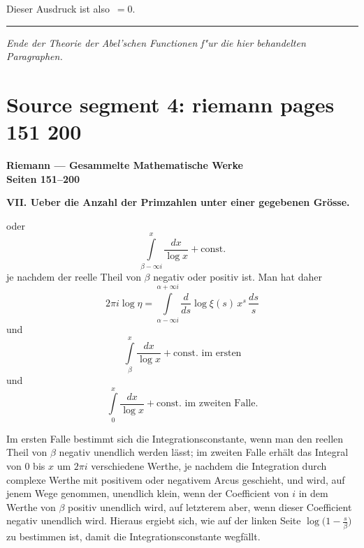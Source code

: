 \documentclass[12pt,a4paper]{book}
\theoremstyle{definition}
\theoremstyle{remark}
\begin{document}
Dieser Ausdruck ist also~$= 0$.

\bigskip
\begin{center}
\rule{0.5\textwidth}{0.4pt}
\end{center}

\vfill
\begin{center}
\textit{Ende der Theorie der Abel'schen Functionen f"ur die hier behandelten
Paragraphen.}
\end{center}

\clearpage
\chapter*{Source segment 4: riemann pages 151 200}

\begin{center}
\Large\textbf{Riemann --- Gesammelte Mathematische Werke}\\[0.5em]
\large\textbf{Seiten 151--200}
\end{center}

\vspace{1em}


\noindent\textbf{VII. Ueber die Anzahl der Primzahlen unter einer gegebenen Gr\"osse.}

\bigskip

\noindent oder
\[
\int\limits_{\beta-\infty i}^{x}\frac{dx}{\log x} + \text{const.}
\]
je nachdem der reelle Theil von $\beta$ negativ oder positiv ist. Man hat daher
\[
2\pi i\log\eta = \int\limits_{\alpha-\infty i}^{\alpha+\infty i} \frac{d}{ds}\log\xi(s)\,x^{s}\,\frac{ds}{s}
\]
und
\[
\int\limits_{\beta}^{x}\frac{dx}{\log x} + \text{const. im ersten}
\]
und
\[
\int\limits_{0}^{x}\frac{dx}{\log x} + \text{const. im zweiten Falle.}
\]

Im ersten Falle bestimmt sich die Integrationsconstante, wenn man den reellen Theil von $\beta$ negativ unendlich werden l\"asst; im zweiten Falle erh\"alt das Integral von $0$ bis $x$ um $2\pi i$ verschiedene Werthe, je nachdem die Integration durch complexe Werthe mit positivem oder negativem Arcus geschieht, und wird, auf jenem Wege genommen, unendlich klein, wenn der Coefficient von $i$ in dem Werthe von $\beta$ positiv unendlich wird, auf letzterem aber, wenn dieser Coefficient negativ unendlich wird. Hieraus ergiebt sich, wie auf der linken Seite $\log\bigl(1-\frac{s}{\beta}\bigr)$ zu bestimmen ist, damit die Integrationsconstante wegf\"allt.
\end{document}
